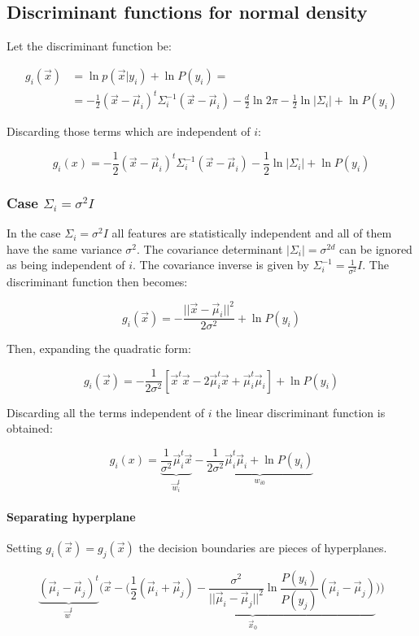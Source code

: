 	\subsection{Discriminant functions for normal density}
	Let the discriminant function be:

	\begin{align*}
		g_i(\vec{x}) &= \ln p(\vec{x}|y_i) + \ln P(y_i)=\\
								 &=-\frac{1}{2}(\vec{x}-\vec{\mu}_i)^t\Sigma_i^{-1}(\vec{x}-\vec{\mu}_i) - \frac{d}{2}\ln 2\pi - \frac{1}{2}\ln|\Sigma_i| + \ln P(y_i)
	\end{align*}

	Discarding those terms which are independent of $i$:

	$$g_i(x) = -\frac{1}{2}(\vec{x}-\vec{\mu}_i)^t\Sigma_i^{-1}(\vec{x}-\vec{\mu}_i)-\frac{1}{2}\ln|\Sigma_i| + \ln P(y_i)$$

		\subsubsection{Case $\Sigma_i = \sigma^2 I$}
		In the case $\Sigma_i = \sigma^2 I$ all features are statistically independent and all of them have the same variance $\sigma^2$.
		The covariance determinant $|\Sigma_i| = \sigma^{2d}$ can be ignored as being independent of $i$.
		The covariance inverse is given by $\Sigma_i^{-1} = \frac{1}{\sigma^2}I$.
		The discriminant function then becomes:

		$$g_i(\vec{x}) = -\frac{||\vec{x}-\vec{\mu}_i||^2}{2\sigma^2} + \ln P(y_i)$$

		Then, expanding the quadratic form:

		$$g_i(\vec{x}) = -\frac{1}{2\sigma^2}[\vec{x}^t\vec{x}-2\vec{\mu}_i^t\vec{x} + \vec{\mu}_i^t\vec{\mu}_i] + \ln P(y_i)$$

		Discarding all the terms independent of $i$ the linear discriminant function is obtained:

		$$g_i(x) = \underbrace{\frac{1}{\sigma^2}\vec{\mu}_i^t\vec{x}}_{\vec{w}_i^t} - \underbrace{\frac{1}{2\sigma^2}\vec{\mu}_i^t\vec{\mu}_i + \ln P(y_i)}_{w_{i0}}$$

			\paragraph{Separating hyperplane}
			Setting $g_i(\vec{x}) = g_j(\vec{x})$ the decision boundaries are pieces of hyperplanes.

			$$\underbrace{(\vec{\mu}_i - \vec{\mu}_j)^t}_{\vec{w}^t}\biggl(\vec{x}-\biggl(\underbrace{\frac{1}{2}(\vec{\mu}_i + \vec{\mu}_j) - \frac{\sigma^2}{||\vec{\mu}_i-\vec{\mu}_j||^2}\ln\frac{P(y_i)}{P(y_j)}(\vec{\mu}_i-\vec{\mu}_j)}_{\vec{x}_0}\biggr)\biggr)$$

